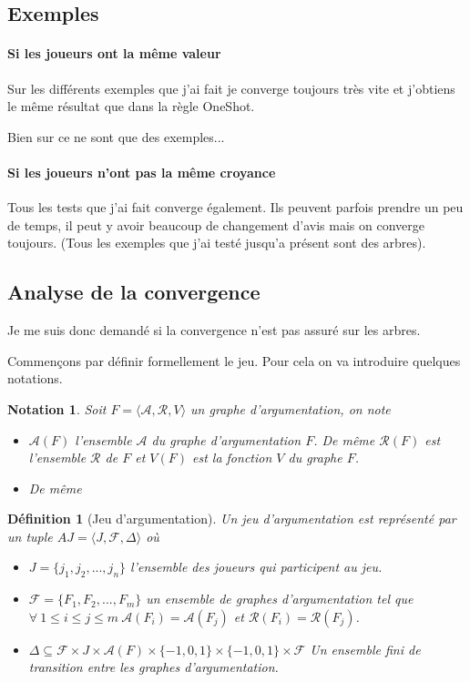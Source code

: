 \documentclass[12pt]{article}
\theoremstyle{defi}
\newtheorem{definition}{Définition}[section]
\theoremstyle{not}
\newtheorem{notation}{Notation}[section]
\theoremstyle{prob}
\begin{document}
  \subsection{Exemples}
    \paragraph{Si les joueurs ont la même valeur}
      Sur les différents exemples que j'ai fait je converge toujours très vite et j'obtiens le même résultat que dans la règle OneShot.

      Bien sur ce ne sont que des exemples...


    \paragraph{Si les joueurs n'ont pas la même croyance}
      Tous les tests que j'ai fait converge également. Ils peuvent parfois prendre un peu de temps, il peut y avoir beaucoup de changement d'avis mais on converge toujours.
      (Tous les exemples que j'ai testé jusqu'a présent sont des arbres).

  \subsection{Analyse de la convergence}
    Je me suis donc demandé si la convergence n'est pas assuré sur les arbres.

    Commençons par définir formellement le jeu.
    Pour cela on va introduire quelques notations.
    \begin{notation}
      Soit $F = \langle \mathcal{A}, \mathcal{R}, V \rangle$ un graphe d'argumentation, on note
      \begin{itemize}
        \item $\mathcal{A}(F)$ l'ensemble $\mathcal{A}$ du graphe d'argumentation $F$. De même $\mathcal{R}(F)$ est l'ensemble $\mathcal{R}$ de $F$ et $V(F)$ est la fonction $V$ du graphe $F$.
        \item De même
      \end{itemize}
    \end{notation}
    \begin{definition}[Jeu d'argumentation]
      Un jeu d'argumentation est représenté par un tuple $AJ=\langle J, \mathcal{F}, \Delta \rangle$ où
      \begin{itemize}
        \item $J = \{j_1, j_2, ..., j_n\}$ l'ensemble des joueurs qui participent au jeu.
        \item $\mathcal{F} = \{F_1, F_2, ..., F_m\}$ un ensemble de graphes d'argumentation tel que $\forall\ 1 \leq i \leq j \leq m\ \mathcal{A}(F_i) = \mathcal{A}(F_j)$ et $\mathcal{R}(F_i) = \mathcal{R}(F_j)$.
        \item $\Delta \subseteq \mathcal{F} \times J \times \mathcal{A}(F) \times \{-1, 0, 1\} \times \{-1, 0, 1\} \times \mathcal{F}$ Un ensemble fini de transition entre les graphes d'argumentation.
      \end{itemize}
    \end{definition}
\end{document}
